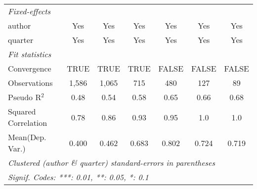 \begin{tabular}{lcccccc}
   \midrule
   \emph{Fixed-effects}\\
   author                                                     & Yes           & Yes            & Yes     & Yes          & Yes                             & Yes\\  
   quarter                                                    & Yes           & Yes            & Yes     & Yes          & Yes                             & Yes\\  
   \midrule
   \emph{Fit statistics}\\
   Convergence                                                &TRUE           & TRUE           & TRUE    & FALSE        & FALSE                           & FALSE\\  
   Observations                                               & 1,586         & 1,065          & 715     & 480          & 127                             & 89\\  
   Pseudo R$^2$                                               & 0.48          & 0.54           & 0.58    & 0.65         & 0.66                            & 0.68\\  
   Squared Correlation                                        & 0.78          & 0.86           & 0.93    & 0.95         & 1.0                             & 1.0\\  
Mean(Dep. Var.) & 0.400 & 0.462 & 0.683 & 0.802 & 0.724 & 0.719 \\
   \midrule \midrule
   \multicolumn{7}{l}{\emph{Clustered (author \& quarter) standard-errors in parentheses}}\\
   \multicolumn{7}{l}{\emph{Signif. Codes: ***: 0.01, **: 0.05, *: 0.1}}\\
\end{tabular}
\par\endgroup
